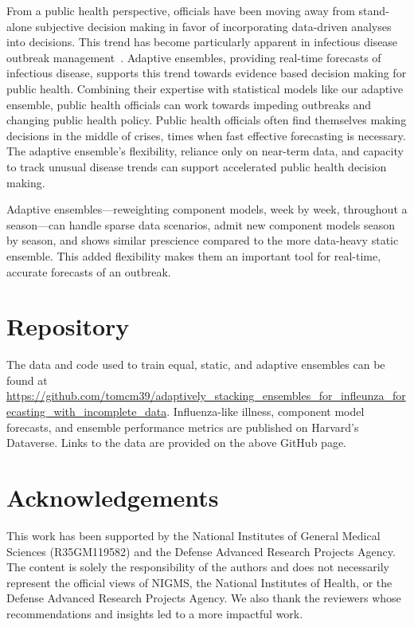 \documentclass[sagev,times,Review,10pt]{sagej}
\begin{document}
From a public health perspective, officials have been moving away from stand-alone subjective decision making in favor of incorporating data-driven analyses into decisions.
This trend has become particularly apparent in infectious disease outbreak management~\citep{Rivers2019}.
Adaptive ensembles, providing real-time forecasts of infectious disease, supports this trend towards evidence based decision making for public health.
Combining their expertise with statistical models like our adaptive ensemble, public health officials can work towards impeding outbreaks and changing public health policy.
Public health officials often find themselves making decisions in the middle of crises, times when fast effective forecasting is necessary. 
The adaptive ensemble's flexibility, reliance only on near-term data, and capacity to track unusual disease trends can support accelerated public health decision making.

Adaptive ensembles---reweighting component models, week by week, throughout a season---can handle sparse data scenarios, admit new component models season by season, and shows similar prescience compared to the more data-heavy static ensemble.
This added flexibility makes them an important tool for real-time, accurate forecasts of an outbreak.


\section{Repository}

The data and code used to train equal, static, and adaptive ensembles can be found at \url{https://github.com/tomcm39/adaptively_stacking_ensembles_for_infleunza_forecasting_with_incomplete_data}.
Influenza-like illness, component model forecasts, and ensemble performance metrics are published on Harvard's Dataverse.
Links to the data are provided on the above GitHub page.


\section{Acknowledgements}
This work has been supported by the National Institutes of General Medical Sciences (R35GM119582) and the Defense Advanced Research Projects Agency.
The content is solely the responsibility of the authors and does not necessarily represent the official views of NIGMS, the National Institutes of Health, or the Defense Advanced Research Projects Agency.
We also thank the reviewers whose recommendations and insights led to a more impactful work.
\end{document}
